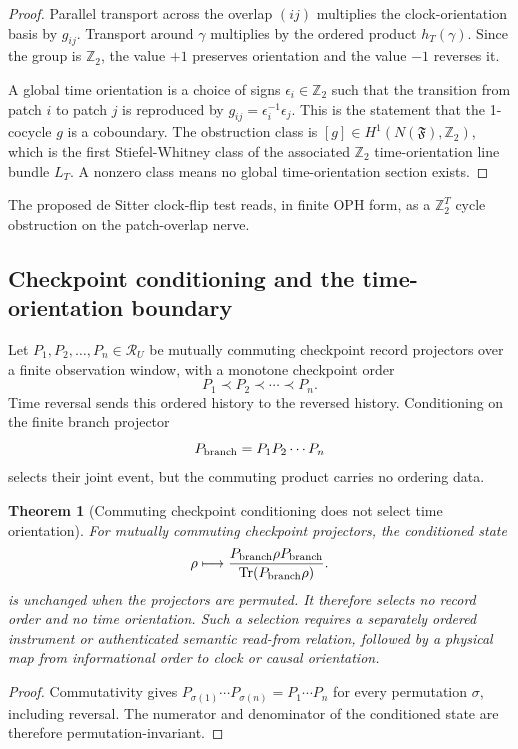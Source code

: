 \documentclass[11pt]{article}
\newtheorem{theorem}{Theorem}[section]
\theoremstyle{remark}
\theoremstyle{plain}
\newcommand{\Tr}{\operatorname{Tr}}
\newcommand{\Z}{\mathbb Z}
\newcommand{\calR}{\mathcal R}
\begin{document}
\begin{proof}
Parallel transport across the overlap \((ij)\) multiplies the clock-orientation basis by \(g_{ij}\).
Transport around \(\gamma\) multiplies by the ordered product \(h_T(\gamma)\). Since the group is
\(\Z_2\), the value \(+1\) preserves orientation and the value \(-1\) reverses it.

A global time orientation is a choice of signs \(\epsilon_i\in\Z_2\) such that the transition from
patch \(i\) to patch \(j\) is reproduced by \(g_{ij}=\epsilon_i^{-1}\epsilon_j\). This is the
statement that the 1-cocycle \(g\) is a coboundary. The obstruction class is
\([g]\in H^1(N(\mathfrak F),\Z_2)\), which is the first Stiefel-Whitney class of the associated
\(\Z_2\) time-orientation line bundle \(L_T\). A nonzero class means no global time-orientation
section exists.
\end{proof}

The proposed de Sitter clock-flip test reads, in finite OPH form, as a \(\Z_2^T\) cycle obstruction
on the patch-overlap nerve.

\subsection{Checkpoint conditioning and the time-orientation boundary}

Let \(P_1,P_2,\ldots,P_n\in\calR_U\) be mutually commuting checkpoint record projectors over a
finite observation window, with a monotone checkpoint order
\[
P_1\prec P_2\prec\cdots\prec P_n.
\]
Time reversal sends this ordered history to the reversed history. Conditioning on the finite branch
projector
\[
P_{\rm branch}=P_1P_2\cdots P_n
\]
selects their joint event, but the commuting product carries no ordering data.

\begin{theorem}[Commuting checkpoint conditioning does not select time orientation]
For mutually commuting checkpoint projectors, the conditioned state
\[
\rho\longmapsto
\frac{P_{\rm branch}\rho P_{\rm branch}}{\Tr(P_{\rm branch}\rho)}.
\]
is unchanged when the projectors are permuted. It therefore selects no record
order and no time orientation. Such a selection requires a separately ordered
instrument or authenticated semantic read-from relation, followed by a
physical map from informational order to clock or causal orientation.
\end{theorem}

\begin{proof}
Commutativity gives
\(P_{\sigma(1)}\cdots P_{\sigma(n)}=P_1\cdots P_n\) for every permutation
\(\sigma\), including reversal. The numerator and denominator of the
conditioned state are therefore permutation-invariant.
\end{proof}
\end{document}
